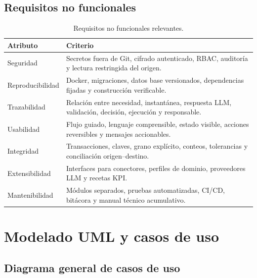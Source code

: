 \documentclass[11pt,letterpaper]{article}
\begin{document}
\subsection{Requisitos no funcionales}

\begin{table}[ht]
\centering
\caption{Requisitos no funcionales relevantes.}
\begin{tabularx}{\textwidth}{@{}p{}X@{}}
  \toprule
  Atributo & Criterio \\
  \midrule
  Seguridad & Secretos fuera de Git, cifrado autenticado, RBAC, auditoría y lectura restringida del origen. \\
  Reproducibilidad & Docker, migraciones, datos base versionados, dependencias fijadas y construcción verificable. \\
  Trazabilidad & Relación entre necesidad, instantánea, respuesta LLM, validación, decisión, ejecución y responsable. \\
  Usabilidad & Flujo guiado, lenguaje comprensible, estado visible, acciones reversibles y mensajes accionables. \\
  Integridad & Transacciones, claves, grano explícito, conteos, tolerancias y conciliación origen--destino. \\
  Extensibilidad & Interfaces para conectores, perfiles de dominio, proveedores LLM y recetas KPI. \\
  Mantenibilidad & Módulos separados, pruebas automatizadas, CI/CD, bitácora y manual técnico acumulativo. \\
  \bottomrule
\end{tabularx}
\end{table}

\section{Modelado UML y casos de uso}

\subsection{Diagrama general de casos de uso}
\end{document}

